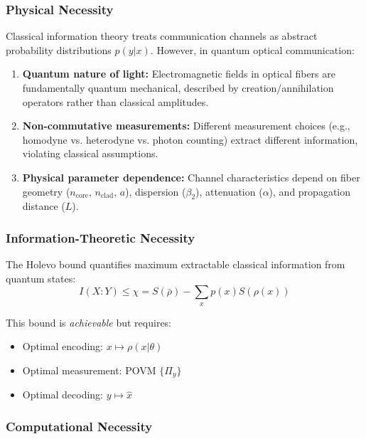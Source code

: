 \documentclass[12pt,a4paper]{article}
\begin{document}
\subsubsection{Physical Necessity}

Classical information theory treats communication channels as abstract probability distributions $p(y|x)$. However, in quantum optical communication:

\begin{enumerate}
\item \textbf{Quantum nature of light:} Electromagnetic fields in optical fibers are fundamentally quantum mechanical, described by creation/annihilation operators rather than classical amplitudes.

\item \textbf{Non-commutative measurements:} Different measurement choices (e.g., homodyne vs. heterodyne vs. photon counting) extract different information, violating classical assumptions.

\item \textbf{Physical parameter dependence:} Channel characteristics depend on fiber geometry ($n_{\text{core}}$, $n_{\text{clad}}$, $a$), dispersion ($\beta_2$), attenuation ($\alpha$), and propagation distance ($L$).
\end{enumerate}

\subsubsection{Information-Theoretic Necessity}

The Holevo bound quantifies maximum extractable classical information from quantum states:
\begin{equation}
I(X:Y) \leq \chi = S(\bar{\rho}) - \sum_x p(x)S(\rho(x))
\end{equation}

This bound is \textit{achievable} but requires:
\begin{itemize}
\item Optimal encoding: $x \mapsto \rho(x|\theta)$
\item Optimal measurement: POVM $\{\Pi_y\}$
\item Optimal decoding: $y \mapsto \hat{x}$
\end{itemize}

\subsubsection{Computational Necessity}
\end{document}
